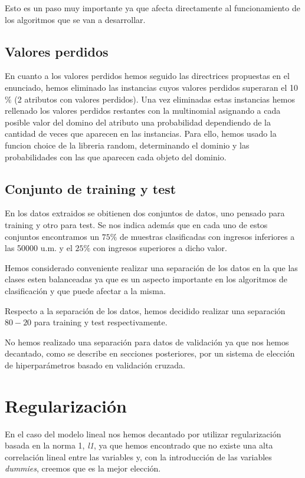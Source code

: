 \documentclass[a4paper,11pt]{article}
\begin{document}
Esto es un paso muy importante ya que afecta directamente al funcionamiento 
de los algoritmos que se van a desarrollar.

\subsection{Valores perdidos}

En cuanto a los valores perdidos hemos seguido las directrices propuestas en el enunciado, hemos eliminado las instancias cuyos valores perdidos superaran el 10$\%$ (2 atributos con valores perdidos). Una vez eliminadas estas instancias hemos rellenado los valores perdidos restantes con la multinomial asignando a cada posible valor del domino del atributo una probabilidad dependiendo de la cantidad de veces que aparecen en las instancias. Para ello, hemos usado la funcion choice de la libreria random, determinando el dominio y las probabilidades con las que aparecen cada objeto del dominio.



\subsection{Conjunto de training y test}

En los datos extraidos se obitienen dos conjuntos de datos, uno pensado para
training y otro para test. Se nos indica además que en cada uno de estos
conjuntos encontramos un $75\%$ de muestras clasificadas con ingresos inferiores
a las 50000 u.m. y el $25\%$ con ingresos superiores a dicho valor. 

Hemos considerado conveniente realizar una separación de los datos en la que las
clases esten balanceadas ya que es un aspecto importante en los algoritmos de
clasificación y que puede afectar a la misma. 

Respecto a la separación de los datos, hemos decidido realizar una separación
$80-20$ para training y test respectivamente.

No hemos realizado una separación para datos de validación ya que nos hemos
decantado, como se describe en secciones posteriores, por un sistema de elección
de hiperparámetros basado en validación cruzada.

\section{Regularización}

En el caso del modelo lineal nos hemos decantado por utilizar regularización
basada en la norma 1, \textit{l1}, ya que hemos encontrado que no existe una
alta correlación lineal entre las variables y, con la introducción de las
variables \textit{dummies}, creemos que es la mejor elección. 
\end{document}

